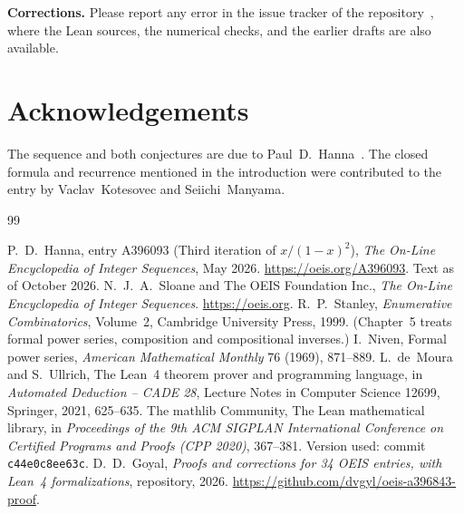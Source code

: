 \documentclass[11pt,a4paper]{article}
\theoremstyle{definition}
\theoremstyle{remark}
\newcommand{\para}[1]{\par\medskip\noindent\textbf{#1}\enspace}
\begin{document}
\para{Corrections.} Please report any error in the issue tracker of the repository~\cite{repo}, where the Lean
sources, the numerical checks, and the earlier drafts are also available.

\section*{Acknowledgements}
The sequence and both conjectures are due to Paul~D.~Hanna~\cite{oeis}. The closed formula and recurrence mentioned in
the introduction were contributed to the entry by Vaclav~Kotesovec and Seiichi~Manyama.

\begin{thebibliography}{99}\small
\raggedright
{} P.~D.~Hanna, entry A396093 (Third iteration of $x/(1-x)^2$), \emph{The On-Line Encyclopedia of Integer Sequences}, May 2026. \url{https://oeis.org/A396093}. Text as of October 2026.
 N.~J.~A.~Sloane and The OEIS Foundation Inc., \emph{The On-Line Encyclopedia of Integer Sequences}. \url{https://oeis.org}.
 R.~P.~Stanley, \emph{Enumerative Combinatorics}, Volume~2, Cambridge University Press, 1999. (Chapter~5 treats formal power series, composition and compositional inverses.)
 I.~Niven, Formal power series, \emph{American Mathematical Monthly} 76 (1969), 871--889.
 L.~de~Moura and S.~Ullrich, The Lean~4 theorem prover and programming language, in \emph{Automated Deduction -- CADE 28}, Lecture Notes in Computer Science 12699, Springer, 2021, 625--635.
 The mathlib Community, The Lean mathematical library, in \emph{Proceedings of the 9th ACM SIGPLAN International Conference on Certified Programs and Proofs (CPP 2020)}, 367--381. Version used: commit \texttt{c44e0c8ee63c}.
 D.~D.~Goyal, \emph{Proofs and corrections for 34 OEIS entries, with Lean~4 formalizations}, repository, 2026. \url{https://github.com/dvgyl/oeis-a396843-proof}.
\end{thebibliography}
\end{document}
